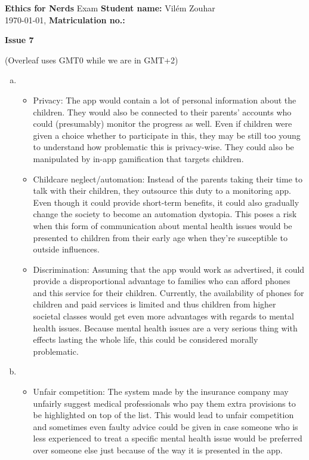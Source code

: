 \documentclass[a4paper, 11pt]{article}
\newcommand{\stdn}{} \newcommand{\studentname}[1]{\renewcommand{\stdn}{#1}}
\newcommand{\mtrk}{} \newcommand{\matriculationno}[1]{\renewcommand{\mtrk}{#1}}
\newcommand{\isnr}{} \newcommand{\issuenumber}[1]{\renewcommand{\isnr}{#1}}
\newcommand{\makeheader}{\textbf{Ethics for Nerds} Exam \hfill \textbf{Student name:} \stdn \\ \today, \currenttime \hfill \textbf{Matriculation no.:} \mtrk \par \textbf{\Large Issue \isnr}}
\begin{document}
\sffamily


\studentname{Vilém Zouhar} %
\matriculationno{} %
\issuenumber{7} %
\makeheader %


(Overleaf uses GMT0 while we are in GMT+2)
\vspace{-0.4cm}

\begin{enumerate}[a)]
    \item
    \begin{itemize}
    \item Privacy:
    The app would contain a lot of personal information about the children.
    They would also be connected to their parents' accounts who could (presumably) monitor the progress as well.
    Even if children were given a choice whether to participate in this, they may be still too young to understand how problematic this is privacy-wise.
    They could also be manipulated by in-app gamification that targets children.
    
    \item Childcare neglect/automation:
    Instead of the parents taking their time to talk with their children, they outsource this duty to a monitoring app.
    Even though it could provide short-term benefits, it could also gradually change the society to become an automation dystopia.
    This poses a risk when this form of communication about mental health issues would be presented to children from their early age when they're susceptible to outside influences.
    
    \item Discrimination:
    Assuming that the app would work as advertised, it could provide a disproportional advantage to families who can afford phones and this service for their children.
    Currently, the availability of phones for children and paid services is limited and thus children from higher societal classes would get even more advantages with regards to mental health issues.
    Because mental health issues are a very serious thing with effects lasting the whole life, this could be considered morally problematic.
    \end{itemize}

    \item
    \begin{itemize}
    \item Unfair competition:
    The system made by the insurance company may unfairly suggest medical professionals who pay them extra provisions to be highlighted on top of the list.
    This would lead to unfair competition and sometimes even faulty advice could be given in case someone who is less experienced to treat a specific mental health issue would be preferred over someone else just because of the way it is presented in the app.
    

\end{itemize}
\end{enumerate}
\end{document}
